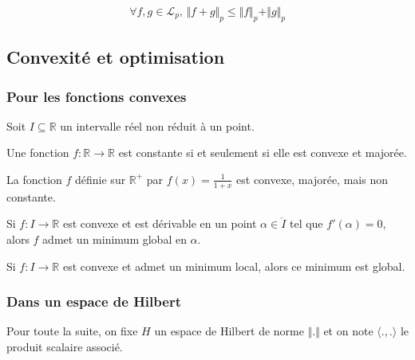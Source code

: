   \begin{theorem}
    \[ \forall f, g \in \mathcal{L}_p, \, \Vert f + g \Vert_p \leq \Vert f \Vert_p + \Vert g \Vert_p \]
  \end{theorem}

  \subsection{Convexité et optimisation}

  \subsubsection{Pour les fonctions convexes}


  Soit $I \subseteq \mathbb{R}$ un intervalle réel non réduit à un point.

  \begin{proposition}
    Une fonction $f : \mathbb{R} \rightarrow \mathbb{R}$ est constante si et seulement si elle est convexe et majorée.
  \end{proposition}

  \begin{cexample}
    La fonction $f$ définie sur $\mathbb{R}^+$ par $f(x) = \frac{1}{1+x}$ est convexe, majorée, mais non constante.
  \end{cexample}

  \begin{proposition}
    Si $f : I \rightarrow \mathbb{R}$ est convexe et est dérivable en un point $\alpha \in \mathring{I}$ tel que $f'(\alpha) = 0$, alors $f$ admet un minimum global en $\alpha$.
  \end{proposition}

  \begin{proposition}
    Si $f : I \rightarrow \mathbb{R}$ est convexe et admet un minimum local, alors ce minimum est global.
  \end{proposition}

  \subsubsection{Dans un espace de Hilbert}


  Pour toute la suite, on fixe $H$ un espace de Hilbert de norme $\Vert . \Vert$ et on note $\langle ., . \rangle$ le produit scalaire associé.

